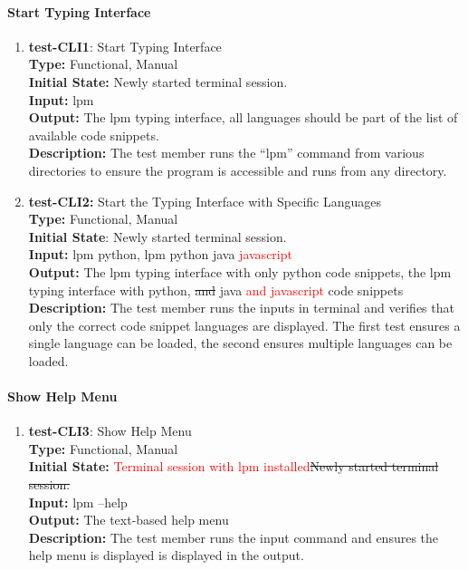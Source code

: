 \documentclass[12pt, titlepage]{article}
\begin{document}
\paragraph{Start Typing Interface}
\begin{enumerate}
\item{\textbf{test-CLI1}: Start Typing Interface\\}
\textbf{Type:} Functional, Manual \\
\textbf{Initial State:} Newly started terminal session.\\
\textbf{Input:} lpm\\
\textbf{Output:} The lpm typing interface, all languages should be part of the list of available code snippets.\\
\textbf{Description:} The test member runs the ``lpm'' command from various directories to ensure the program is accessible and runs from any directory.\\

\item{\textbf{test-CLI2:} Start the Typing Interface with Specific Languages\\}
\textbf{Type:} Functional, Manual \\
\textbf{Initial State}: Newly started terminal session.\\
\textbf{Input:} lpm python, lpm python java \textcolor{red}{javascript}\\
\textbf{Output:} The lpm typing interface with only python code snippets, the lpm typing interface with python, \sout{and} java \textcolor{red}{and javascript} code snippets\\
\textbf{Description:} The test member runs the inputs in terminal and verifies that only the correct code snippet languages are displayed. The first test ensures a single language can be loaded, the second ensures multiple languages can be loaded.\\
\end{enumerate}

\paragraph{Show Help Menu}

\begin{enumerate}
\item{\textbf{test-CLI3}: Show Help Menu\\}
\textbf{Type:} Functional, Manual\\
\textbf{Initial State:} \textcolor{red}{Terminal session with lpm installed}\sout{Newly started terminal session.} \\
\textbf{Input:} lpm --help \\
\textbf{Output:} The text-based help menu \\
\textbf{Description:} The test member runs the input command and ensures the help menu is displayed is displayed in the output. \\
\end{enumerate}
\end{document}

